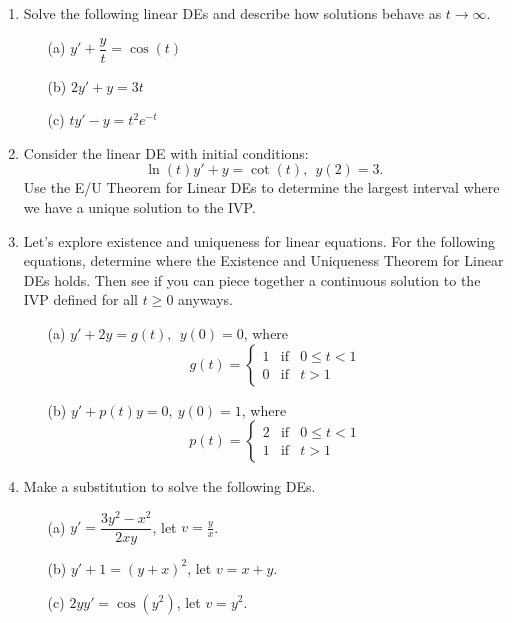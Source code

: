 \documentclass[12pt]{article}
\begin{document}
\begin{enumerate}
\item Solve the following linear DEs and describe how solutions behave as $t\to \infty$.  
\begin{multicols}{3}
\begin{itemize}
\item[(a)] $y' + \dfrac{y}{t} = \cos (t)$
\item[(b)] $2y' + y = 3t$
\item[(c)] $ty' -y = t^2e^{-t}$
\end{itemize}
\end{multicols}

\item Consider the linear DE with initial conditions:
$$\ln(t)y' + y = \cot(t),\ \  y(2) = 3.$$
Use the E/U Theorem for Linear DEs to determine the largest interval where we have a unique solution to the IVP.


\item Let's explore existence and uniqueness for linear equations.  For the following equations, determine where the Existence and Uniqueness Theorem for Linear DEs holds.  Then see if you can piece together a continuous solution to the IVP defined for all $t \geq 0$ anyways.
\begin{itemize}
\item[(a)] $y' + 2y = g(t), \ \ y(0) = 0$, where 
$$g(t) = \left\{ \begin{array}{lcr} 1 &\text{if}& 0\leq t < 1\\ 0 & \text{if} & t>1\end{array}\right.$$

\item[(b)] $y' + p(t)y = 0, \ y(0) = 1$, where
$$p(t) = \left\{ \begin{array}{lcr} 2 &\text{if}& 0\leq t < 1\\ 1 & \text{if} & t>1\end{array}\right.$$
\end{itemize}



\item Make a substitution to solve the following DEs.  
\begin{itemize}
\item[(a)] $y' = \dfrac{3y^2-x^2}{2xy}$, let $v= \frac{y}{x}$.
\item[(b)] $y' + 1 = (y+x)^2$, let $v = x+y$.
\item[(c)] $2yy' = \cos(y^2)$, let $v = y^2$.
\end{itemize}



\end{enumerate}
\end{document}
